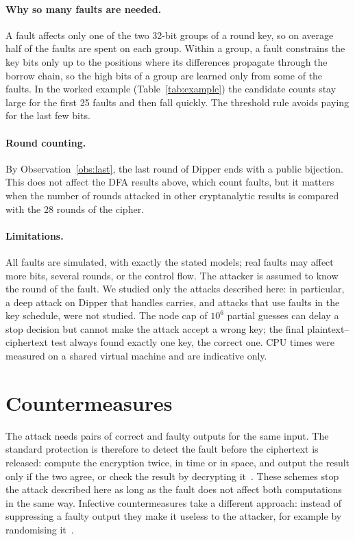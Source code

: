 \documentclass[pdflatex,sn-mathphys-num]{sn-jnl}
\theoremstyle{thmstyleone}%
\theoremstyle{thmstylethree}%
\begin{document}
\paragraph{Why so many faults are needed.} A fault affects only one of the two 32-bit groups of a round key,
so on average half of the faults are spent on each group. Within a group, a fault constrains the key bits only
up to the positions where its differences propagate through the borrow chain, so the high bits of a group are
learned only from some of the faults. In the worked example (Table~\ref{tab:example}) the candidate counts stay
large for the first 25 faults and then fall quickly. The threshold rule avoids paying for the last few bits.

\paragraph{Round counting.} By Observation~\ref{obs:last}, the last round of Dipper ends with a public
bijection. This does not affect the DFA results above, which count faults, but it matters when the number of
rounds attacked in other cryptanalytic results is compared with the 28 rounds of the cipher.

\paragraph{Limitations.} All faults are simulated, with exactly the stated models; real faults may affect more
bits, several rounds, or the control flow. The attacker is assumed to know the round of the fault. We studied
only the attacks described here: in particular, a deep attack on Dipper that handles carries, and attacks that
use faults in the key schedule, were not studied. The node cap of $10^{6}$ partial guesses can delay a stop
decision but cannot make the attack accept a wrong key; the final plaintext--ciphertext test always found
exactly one key, the correct one. CPU times were measured on a shared virtual machine and are indicative only.

\section{Countermeasures}\label{sec:cm}

The attack needs pairs of correct and faulty outputs for the same input. The standard protection is
therefore to detect the fault before the ciphertext is released: compute the encryption twice, in time or in
space, and output the result only if the two agree, or check the result by decrypting
it~\cite{BarEl2006,Barenghi2012,Karaklajic2013}. These schemes stop the attack described here as long as the
fault does not affect both computations in the same way. Infective countermeasures take a different approach:
instead of suppressing a faulty output they make it useless to the attacker, for example by randomising
it~\cite{Gierlichs2012}.
\end{document}
